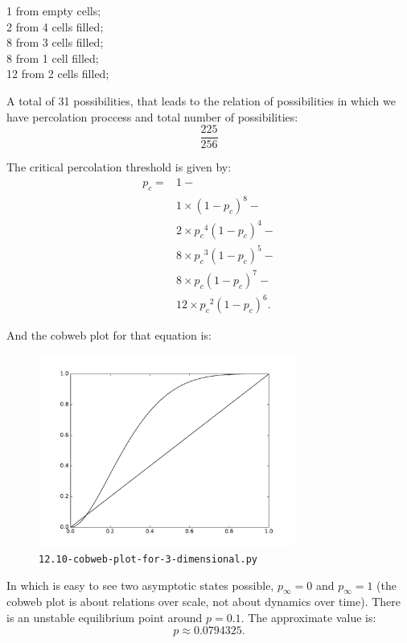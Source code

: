 \vspace{5mm}
1 from empty cells; \\
2 from 4 cells filled; \\
8 from 3 cells filled; \\
8 from 1 cell filled; \\
12 from 2 cells filled;

\vspace{5mm}
A total of 31 possibilities, that leads to the relation of possibilities in
which we have percolation proccess and total number of possibilities:
\begin{equation}
  \frac{225}{256}
\end{equation}

The critical percolation threshold is given by:
\begin{equation}
  \begin{aligned}
    p_c = { } & 1 - \\
              & 1 \times (1-p_c)^8 - \\
              & 2 \times {p_c}^4 (1-p_c)^4 - \\
              & 8 \times {p_c}^3 (1-p_c)^5 - \\
              & 8 \times p_c (1-p_c)^7 - \\
              & 12 \times {p_c}^2 (1-p_c)^6.
  \end{aligned}
\end{equation}

And the cobweb plot for that equation is:
\begin{figure}[h]
  \centering
  \includegraphics[width=0.75\textwidth]{./figures/12.10-cobweb-plot-for-3-dimensional.pdf}
  \caption{\texttt{12.10-cobweb-plot-for-3-dimensional.py}}
\end{figure}

In which is easy to see two asymptotic states possible, $p_\infty = 0$ and
$p_\infty = 1$ (the cobweb plot is about relations over scale, not about
dynamics over time). There is an unstable equilibrium point around $p = 0.1$.
The approximate value is:
\begin{equation}
  p \approx 0.0794325.
\end{equation}

